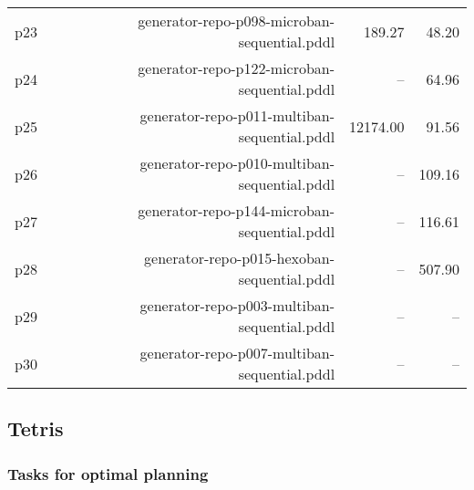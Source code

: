 \documentclass{article}
\begin{document}
\begin{center}
\begin{tabular}{@{}l|r|r|r@{}}
  p23& generator-repo-p098-microban-sequential.pddl&189.27&48.20\\
  p24& generator-repo-p122-microban-sequential.pddl&--&64.96\\
  p25& generator-repo-p011-multiban-sequential.pddl&12174.00&91.56\\
  p26& generator-repo-p010-multiban-sequential.pddl&--&109.16\\
  p27& generator-repo-p144-microban-sequential.pddl&--&116.61\\
  p28& generator-repo-p015-hexoban-sequential.pddl&--&507.90\\
  p29& generator-repo-p003-multiban-sequential.pddl&--&--\\
  p30& generator-repo-p007-multiban-sequential.pddl&--&--
                            \end{tabular}
                            \end{center}
                    
                \newpage \subsection{Tetris}
                    \subsubsection*{Tasks for optimal planning}
                    
\end{document}
